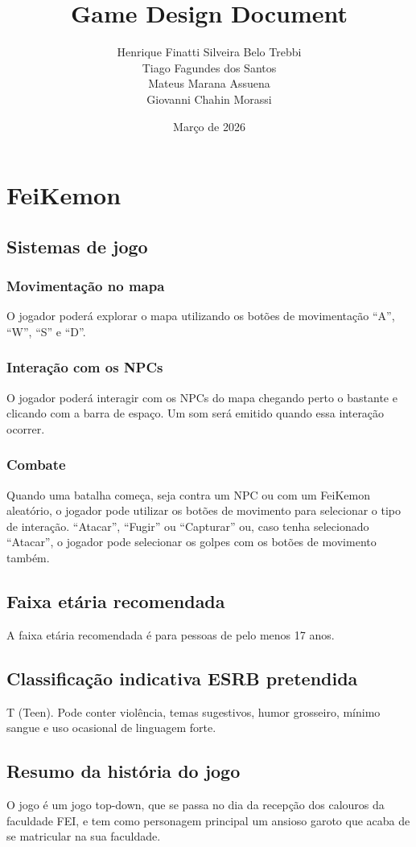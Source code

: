 \documentclass[a4paper,12pt]{article}
\title{Game Design Document}
\author{
    Henrique Finatti Silveira Belo Trebbi \\
    Tiago Fagundes dos Santos \\
    Mateus Marana Assuena \\
    Giovanni Chahin Morassi \\
}
\date{Março de 2026}
\begin{document}
\maketitle
\newpage
\section{FeiKemon}
\subsection{Sistemas de jogo}
\subsubsection{Movimentação no mapa}
O jogador poderá explorar o mapa utilizando os botões de movimentação “A”, “W”, “S” e “D”.

\subsubsection{Interação com os NPCs}
O jogador poderá interagir com os NPCs do mapa chegando perto o bastante e clicando com a barra de espaço.
Um som será emitido quando essa interação ocorrer.

\subsubsection{Combate}
Quando uma batalha começa, seja contra um NPC ou com um FeiKemon aleatório,
o jogador pode utilizar os botões de movimento para selecionar o tipo de interação.
“Atacar”, “Fugir” ou “Capturar” ou, caso tenha selecionado “Atacar”,
o jogador pode selecionar os golpes com os botões de movimento também.

\subsection{Faixa etária recomendada}
A faixa etária recomendada é para pessoas de pelo menos 17 anos.

\subsection{Classificação indicativa ESRB pretendida}
T (Teen). Pode conter violência, temas sugestivos, humor grosseiro, mínimo sangue e uso ocasional de linguagem forte.

\subsection{Resumo da história do jogo}
O jogo é um jogo top-down, que se passa no dia da recepção dos calouros da faculdade FEI, e tem como personagem principal
um ansioso garoto que acaba de se matricular na sua faculdade.
\end{document}
